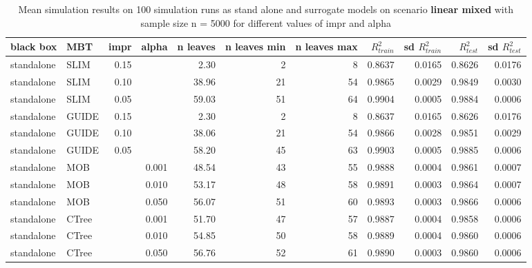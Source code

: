\begin{table}[!htb]

\caption{Mean simulation results on 100 simulation runs as stand alone and surrogate models on scenario \textbf{linear mixed} with sample size n = 5000 for different values of impr and alpha}
\centering \tiny
\begin{tabular}[t]{l|l|r|r|r|r|r|r|r|r|r}
\hline
black box & MBT & impr & alpha & n leaves & n leaves min & n leaves max &  $R^2_{train}$ & sd $R^2_{train}$ & $R^2_{test}$ & sd $R^2_{test}$\\
\hline
standalone & SLIM & 0.15 & & 2.30 & 2 & 8 & 0.8637 & 0.0165 & 0.8626 & 0.0176\\
standalone & SLIM & 0.10 & & 38.96 & 21 & 54 & 0.9865 & 0.0029 & 0.9849 & 0.0030\\
standalone & SLIM & 0.05 & & 59.03 & 51 & 64 & 0.9904 & 0.0005 & 0.9884 & 0.0006\\
standalone & GUIDE & 0.15 & & 2.30 & 2 & 8 & 0.8637 & 0.0165 & 0.8626 & 0.0176\\
standalone & GUIDE & 0.10 & & 38.06 & 21 & 54 & 0.9866 & 0.0028 & 0.9851 & 0.0029\\
standalone & GUIDE & 0.05 & & 58.20 & 45 & 63 & 0.9903 & 0.0005 & 0.9885 & 0.0006\\
standalone & MOB & & 0.001 & 48.54 & 43 & 55 & 0.9888 & 0.0004 & 0.9861 & 0.0007\\
standalone & MOB & & 0.010 & 53.17 & 48 & 58 & 0.9891 & 0.0003 & 0.9864 & 0.0007\\
standalone & MOB & & 0.050 & 56.07 & 51 & 60 & 0.9893 & 0.0003 & 0.9866 & 0.0006\\
standalone & CTree & & 0.001 & 51.70 & 47 & 57 & 0.9887 & 0.0004 & 0.9858 & 0.0006\\
standalone & CTree & & 0.010 & 54.85 & 50 & 58 & 0.9889 & 0.0004 & 0.9860 & 0.0006\\
standalone & CTree & & 0.050 & 56.76 & 52 & 61 & 0.9890 & 0.0003 & 0.9860 & 0.0006\\


\end{tabular}
\end{table}

